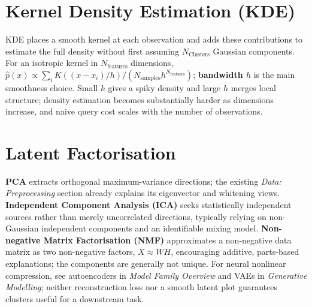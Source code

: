 \section{Kernel Density Estimation (KDE)}
KDE places a smooth kernel at each observation and adds these contributions to estimate the full density without first assuming $N_{\text{Clusters}}$ Gaussian components.
For an isotropic kernel in $N_{\text{features}}$ dimensions, $\hat p(x)\propto \sum_i K((x-x_i)/h)/(N_{\text{samples}}h^{N_{\text{features}}})$; \textbf{bandwidth $h$} is the main smoothness choice.
Small $h$ gives a spiky density and large $h$ merges local structure; density estimation becomes substantially harder as dimensions increase, and naive query cost scales with the number of observations.

\section{Latent Factorisation}
\textbf{PCA} extracts orthogonal maximum-variance directions; the existing \emph{Data: Preprocessing} section already explains its eigenvector and whitening views.
\textbf{Independent Component Analysis (ICA)} seeks statistically independent sources rather than merely uncorrelated directions, typically relying on non-Gaussian independent components and an identifiable mixing model.
\textbf{Non-negative Matrix Factorisation (NMF)} approximates a non-negative data matrix as two non-negative factors, $X\approx WH$, encouraging additive, parts-based explanations; the components are generally not unique.
For neural nonlinear compression, see autoencoders in \emph{Model Family Overview} and VAEs in \emph{Generative Modelling}; neither reconstruction loss nor a smooth latent plot guarantees clusters useful for a downstream task.

